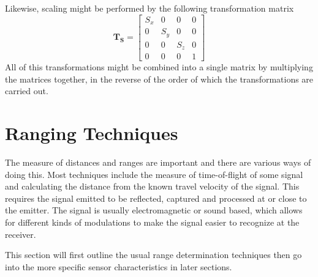 Likewise, scaling might be performed by the following transformation matrix
\begin{equation}
    \label{chap2:eq-TransformationMatrixScaling}
    \mathbf{T_S} = \left [ \begin{array}{cccc}
                                S_x & 0 & 0 & 0 \\
                                0 & S_y & 0 & 0 \\
                                0 & 0 & S_z & 0 \\
                                0 & 0 & 0 & 1 
                                 \end{array} \right]
\end{equation}
All of this transformations might be combined into a single matrix by multiplying the
matrices together, in the reverse of the order of which the transformations are carried
out. 


\section{Ranging Techniques}
The measure of distances and ranges are important and there are various ways of doing
this. Most techniques include the measure of time-of-flight of some signal and calculating
the distance from the known travel velocity of the signal. This requires the signal
emitted to be reflected, captured and processed at or close to the emitter. The signal is
usually electromagnetic or sound based, which allows for different kinds of modulations to
make the signal easier to recognize at the receiver.


This section will first outline the usual range determination techniques then go into the
more specific sensor characteristics in later sections.


